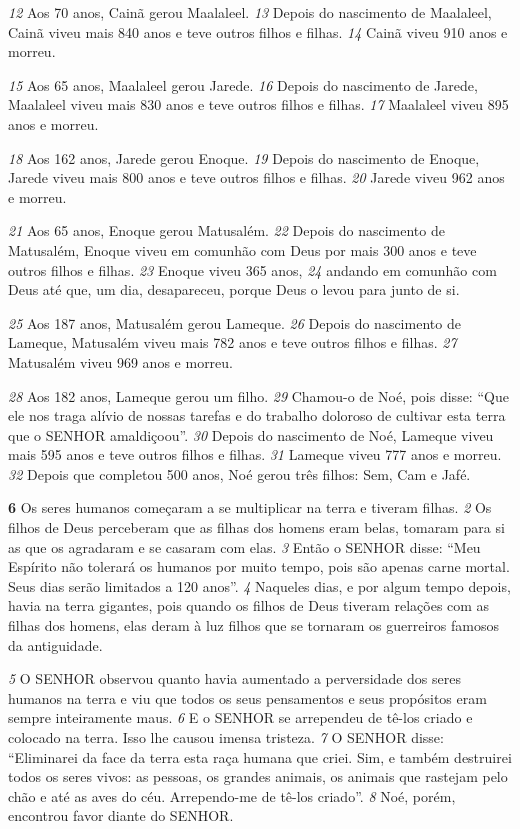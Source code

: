 \bigskip
\textit{\tiny 12}
Aos 70 anos, Cainã gerou Maalaleel.  
\textit{\tiny 13}
Depois do nascimento de Maalaleel,
 Cainã viveu mais 840 anos e teve outros filhos e filhas.  
\textit{\tiny 14}
Cainã viveu 910 anos e morreu.

\bigskip
\textit{\tiny 15}
Aos 65 anos, Maalaleel gerou Jarede.  
\textit{\tiny 16}
Depois do nascimento de Jarede,
 Maalaleel viveu mais 830 anos e teve outros filhos e filhas.  
\textit{\tiny 17}
Maalaleel viveu 895 anos e morreu.

\bigskip
\textit{\tiny 18}
Aos 162 anos, Jarede gerou Enoque.  
\textit{\tiny 19}
Depois do nascimento de Enoque, Jarede
 viveu mais 800 anos e teve outros filhos e filhas.  
\textit{\tiny 20}
Jarede viveu 962 anos e
 morreu.

\bigskip
\textit{\tiny 21}
Aos 65 anos, Enoque gerou Matusalém.  
\textit{\tiny 22}
Depois do nascimento de Matusalém,
 Enoque viveu em comunhão com Deus por mais 300 anos e teve outros filhos e
 filhas.  
\textit{\tiny 23}
Enoque viveu 365 anos,  
\textit{\tiny 24}
andando em comunhão com Deus até que,
 um dia, desapareceu, porque Deus o levou para junto de si.

\bigskip
\textit{\tiny 25}
Aos 187 anos, Matusalém gerou Lameque.  
\textit{\tiny 26}
Depois do nascimento de
 Lameque, Matusalém viveu mais 782 anos e teve outros filhos e filhas.
\textit{\tiny 27}
Matusalém viveu 969 anos e morreu.

\bigskip
\textit{\tiny 28}
Aos 182 anos, Lameque gerou um filho.  
\textit{\tiny 29}
Chamou-o de Noé, pois disse: “Que
 ele nos traga alívio de nossas tarefas e do trabalho doloroso de cultivar esta terra
 que o SENHOR amaldiçoou”.  
\textit{\tiny 30}
Depois do nascimento de Noé, Lameque viveu mais
 595 anos e teve outros filhos e filhas.  
\textit{\tiny 31}
Lameque viveu 777 anos e morreu.
\textit{\tiny 32}
Depois que completou 500 anos, Noé gerou três filhos: Sem, Cam e Jafé.

\bigskip
\textbf{\large 6} 
Os seres humanos começaram a se multiplicar na terra e tiveram filhas. 
\textit{\tiny 2}
Os filhos de Deus perceberam que as filhas dos homens eram belas, tomaram para si
as que os agradaram e se casaram com elas. 
\textit{\tiny 3}
Então o SENHOR disse: “Meu Espírito
não tolerará os humanos por muito tempo, pois são apenas carne mortal. Seus
dias serão limitados a 120 anos”.
\textit{\tiny 4}
Naqueles dias, e por algum tempo depois, havia na terra gigantes, pois
quando os filhos de Deus tiveram relações com as filhas dos homens, elas deram à
luz filhos que se tornaram os guerreiros famosos da antiguidade.

\bigskip
\textit{\tiny 5}
O SENHOR observou quanto havia aumentado a perversidade dos seres
humanos na terra e viu que todos os seus pensamentos e seus propósitos eram
sempre inteiramente maus. 
\textit{\tiny 6}
E o SENHOR se arrependeu de tê-los criado e colocado
na terra. Isso lhe causou imensa tristeza. 
\textit{\tiny 7}
O SENHOR disse: “Eliminarei da face da
terra esta raça humana que criei. Sim, e também destruirei todos os seres vivos: as
pessoas, os grandes animais, os animais que rastejam pelo chão e até as aves do
céu. Arrependo-me de tê-los criado”. 
\textit{\tiny 8}
Noé, porém, encontrou favor diante do
SENHOR.

